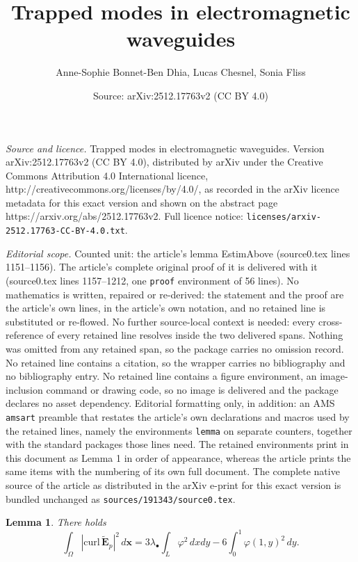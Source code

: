 \documentclass[10pt,a4paper]{amsart}
\title{Trapped modes in electromagnetic waveguides}
\author{Anne-Sophie Bonnet-Ben Dhia, Lucas Chesnel, Sonia Fliss}
\date{Source: arXiv:2512.17763v2 (CC BY 4.0)}
\newtheorem{lemma}{Lemma}
\def\E{\boldsymbol{E}}
\newcommand{\GL}{L}
\newcommand{\Om}{\Omega}
\newcommand{\bfx}{\boldsymbol{x}}
\newcommand{\curlvec}{\boldsymbol{\mrm{curl}}\,}
\newcommand{\dsp}{\displaystyle}
\newcommand{\mrm}[1]{\mathrm{#1}}
\begin{document}
\maketitle

\noindent\emph{Source and licence.} Trapped modes in electromagnetic waveguides. Version arXiv:2512.17763v2 (CC BY 4.0), distributed by arXiv under the Creative Commons Attribution 4.0 International licence, http://creativecommons.org/licenses/by/4.0/, as recorded in the arXiv licence metadata for this exact version and shown on the abstract page https://arxiv.org/abs/2512.17763v2. Full licence notice: \texttt{licenses/arxiv-2512.17763-CC-BY-4.0.txt}.\par\smallskip

\noindent\textit{Editorial scope.} Counted unit: the article's lemma EstimAbove (source0.tex lines 1151--1156). The article's complete original proof of it is delivered with it (source0.tex lines 1157--1212, one \texttt{proof} environment of 56 lines). No mathematics is written, repaired or re-derived: the statement and the proof are the article's own lines, in the article's own notation, and no retained line is substituted or re-flowed.  No further source-local context is needed: every cross-reference of every retained line resolves inside the two delivered spans.  Nothing was omitted from any retained span, so the package carries no omission record.  No retained line contains a citation, so the wrapper carries no bibliography and no bibliography entry.  No retained line contains a figure environment, an image-inclusion command or drawing code, so no image is delivered and the package declares no asset dependency.  Editorial formatting only, in addition: an AMS \texttt{amsart} preamble that restates the article's own declarations and macros used by the retained lines, namely the environments \texttt{lemma} on separate counters, together with the standard packages those lines need.  The retained environments print in this document as Lemma 1 in order of appearance, whereas the article prints the same items with the numbering of its own full document.  The complete native source of the article as distributed in the arXiv e-print for this exact version is bundled unchanged as \texttt{sources/191343/source0.tex}.
\begin{lemma}
There holds
\begin{equation}\label{EstimAbove}
\dsp\int_{\Om}|\curlvec \tilde{\E}_p|^2\,d\bfx=3\lambda_\bullet\int_\GL\varphi^2\,dxdy-6\int_0^1\varphi(1,y)^2\,dy.
\end{equation}
\end{lemma}
\end{document}
